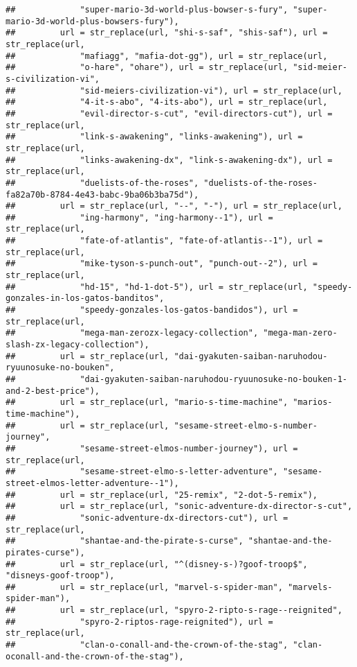\documentclass[
]{article}
\begin{document}
\begin{verbatim}
##             "super-mario-3d-world-plus-bowser-s-fury", "super-mario-3d-world-plus-bowsers-fury"), 
##         url = str_replace(url, "shi-s-saf", "shis-saf"), url = str_replace(url, 
##             "mafiagg", "mafia-dot-gg"), url = str_replace(url, 
##             "o-hare", "ohare"), url = str_replace(url, "sid-meier-s-civilization-vi", 
##             "sid-meiers-civilization-vi"), url = str_replace(url, 
##             "4-it-s-abo", "4-its-abo"), url = str_replace(url, 
##             "evil-director-s-cut", "evil-directors-cut"), url = str_replace(url, 
##             "link-s-awakening", "links-awakening"), url = str_replace(url, 
##             "links-awakening-dx", "link-s-awakening-dx"), url = str_replace(url, 
##             "duelists-of-the-roses", "duelists-of-the-roses-fa82a70b-8784-4e43-babc-9ba06b3ba75d"), 
##         url = str_replace(url, "--", "-"), url = str_replace(url, 
##             "ing-harmony", "ing-harmony--1"), url = str_replace(url, 
##             "fate-of-atlantis", "fate-of-atlantis--1"), url = str_replace(url, 
##             "mike-tyson-s-punch-out", "punch-out--2"), url = str_replace(url, 
##             "hd-15", "hd-1-dot-5"), url = str_replace(url, "speedy-gonzales-in-los-gatos-banditos", 
##             "speedy-gonzales-los-gatos-bandidos"), url = str_replace(url, 
##             "mega-man-zerozx-legacy-collection", "mega-man-zero-slash-zx-legacy-collection"), 
##         url = str_replace(url, "dai-gyakuten-saiban-naruhodou-ryuunosuke-no-bouken", 
##             "dai-gyakuten-saiban-naruhodou-ryuunosuke-no-bouken-1-and-2-best-price"), 
##         url = str_replace(url, "mario-s-time-machine", "marios-time-machine"), 
##         url = str_replace(url, "sesame-street-elmo-s-number-journey", 
##             "sesame-street-elmos-number-journey"), url = str_replace(url, 
##             "sesame-street-elmo-s-letter-adventure", "sesame-street-elmos-letter-adventure--1"), 
##         url = str_replace(url, "25-remix", "2-dot-5-remix"), 
##         url = str_replace(url, "sonic-adventure-dx-director-s-cut", 
##             "sonic-adventure-dx-directors-cut"), url = str_replace(url, 
##             "shantae-and-the-pirate-s-curse", "shantae-and-the-pirates-curse"), 
##         url = str_replace(url, "^(disney-s-)?goof-troop$", "disneys-goof-troop"), 
##         url = str_replace(url, "marvel-s-spider-man", "marvels-spider-man"), 
##         url = str_replace(url, "spyro-2-ripto-s-rage--reignited", 
##             "spyro-2-riptos-rage-reignited"), url = str_replace(url, 
##             "clan-o-conall-and-the-crown-of-the-stag", "clan-oconall-and-the-crown-of-the-stag"), 

\end{verbatim}
\end{document}
